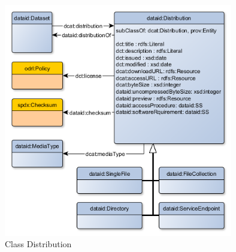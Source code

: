 \documentclass[a4paper,english,twoside,BCOR1.5cm,headsepline,DIV12,appendixprefix,final,12pt]{scrbook}
\begin{document}
\begin{figure}[!htbp]
\centering
  \includegraphics[width=10cm]{images/ClassDistribution.png}
  \caption{Class Distribution}
  \label{fig:example}
\end{figure}
\end{document}
